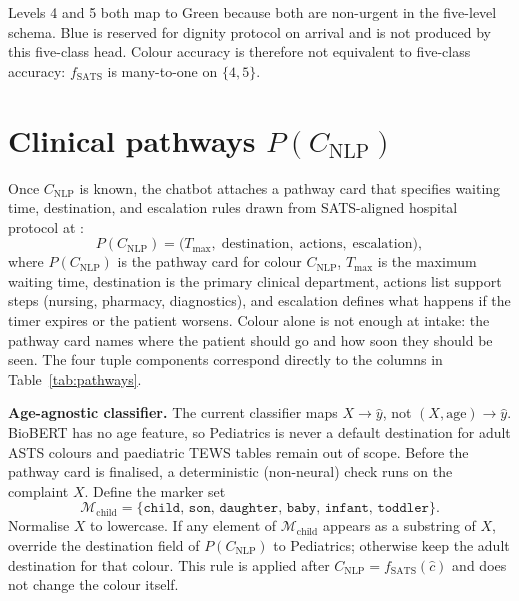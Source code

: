 Levels 4 and 5 both map to Green because both are non-urgent in the five-level schema. Blue is reserved for dignity protocol on arrival and is not produced by this five-class head. Colour accuracy is therefore not equivalent to five-class accuracy: \(f_{\mathrm{SATS}}\) is many-to-one on \(\{4,5\}\).

\section{Clinical pathways \(P(C_{\mathrm{NLP}})\)}
\label{sec:pathways}

Once \(C_{\mathrm{NLP}}\) is known, the chatbot attaches a pathway card that specifies waiting time, destination, and escalation rules drawn from SATS-aligned hospital protocol at \examplehospital{}:
\begin{equation}
  P(C_{\mathrm{NLP}}) = \bigl(T_{\max},\; \text{destination},\; \text{actions},\; \text{escalation}\bigr),
\end{equation}
where \(P(C_{\mathrm{NLP}})\) is the pathway card for colour \(C_{\mathrm{NLP}}\), \(T_{\max}\) is the maximum waiting time, destination is the primary clinical department, actions list support steps (nursing, pharmacy, diagnostics), and escalation defines what happens if the timer expires or the patient worsens. Colour alone is not enough at intake: the pathway card names where the patient should go and how soon they should be seen. The four tuple components correspond directly to the columns in Table~\ref{tab:pathways}.

\textbf{Age-agnostic classifier.} The current classifier maps \(X\to\hat{y}\), not \((X,\mathrm{age})\to\hat{y}\). BioBERT has no age feature, so Pediatrics is never a default destination for adult ASTS colours and paediatric TEWS tables remain out of scope. Before the pathway card is finalised, a deterministic (non-neural) check runs on the complaint \(X\). Define the marker set
\begin{equation}
  \mathcal{M}_{\mathrm{child}}=\{\texttt{child},\,\texttt{son},\,\texttt{daughter},\,\texttt{baby},\,\texttt{infant},\,\texttt{toddler}\}.
\end{equation}
Normalise \(X\) to lowercase. If any element of \(\mathcal{M}_{\mathrm{child}}\) appears as a substring of \(X\), override the destination field of \(P(C_{\mathrm{NLP}})\) to Pediatrics; otherwise keep the adult destination for that colour. This rule is applied after \(C_{\mathrm{NLP}}=f_{\mathrm{SATS}}(\hat{c})\) and does not change the colour itself.

